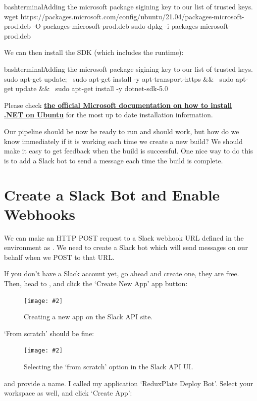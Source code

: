 \documentclass[a4paper,headinclude=on,footinclude=on,12pt,oneside]{scrbook}
\newcommand{\link}[2]{\textbf{\textcolor{monokaiPink}{\href{#2}{#1}}}}
\newcommand{\standardfigure}[3]{\begin{figure}[H]\begin{center}\texttt{[image: \#2]}\caption{#3}\label{fig:#2}\end{center}\end{figure}}
\begin{document}
\begin{codeInput}{bash}{terminal}{Adding the microsoft package sigining key to our list of trusted keys.}
wget https://packages.microsoft.com/config/ubuntu/21.04/packages-microsoft-prod.deb -O packages-microsoft-prod.deb
  sudo dpkg -i packages-microsoft-prod.deb
\end{codeInput}

We can then install the SDK (which includes the runtime):

\begin{codeInput}{bash}{terminal}{Adding the microsoft package sigining key to our list of trusted keys.}
sudo apt-get update; \
  sudo apt-get install -y apt-transport-https && \
  sudo apt-get update && \
  sudo apt-get install -y dotnet-sdk-5.0
\end{codeInput}

Please check \link{the official Microsoft documentation on how to install .NET on Ubuntu}{https://docs.microsoft.com/en-us/dotnet/core/install/linux-ubuntu} for the most up to date installation information.

Our pipeline should be now be ready to run and should work, but how do we know immediately if it is working each time we create a new build? We should make it easy to get feedback when the build is successful. One nice way to do this is to add a Slack bot to send a message each time the build is complete.

\section{Create a Slack Bot and Enable Webhooks}

 We can make an HTTP POST request to a Slack webhook URL defined in the environment as . We need to create a Slack bot which will send messages on our behalf when we POST to that URL.

If you don't have a Slack account yet, go ahead and create one, they are free. Then, head to , and click the `Create New App' app button:

\standardfigure{\textwidth}{/backend/slack/create-new-app}{Creating a new app on the Slack API site.}

`From scratch' should be fine:

\standardfigure{\textwidth}{/backend/slack/from-scratch}{Selecting the `from scratch' option in the Slack API UI.}

and provide a name. I called my application `ReduxPlate Deploy Bot'. Select your workspace as well, and click `Create App':
\end{document}
